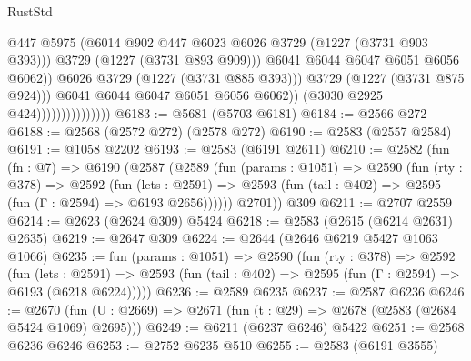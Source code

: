 \begin{lexlean}{RustStd}
\begin{coremodule}
                                              @447
                                              @5975
                                              (@6014
                                                @902
                                                @447
                                                @6023
                                                @6026
                                                @3729
                                                (@1227 (@3731 @903 @393)))
                                              @3729
                                              (@1227 (@3731 @893 @909)))
                                            @6041
                                            @6044
                                            @6047
                                            @6051
                                            @6056
                                            @6062))
                                        @6026
                                        @3729
                                        (@1227 (@3731 @885 @393)))
                                      @3729
                                      (@1227 (@3731 @875 @924)))
                                    @6041
                                    @6044
                                    @6047
                                    @6051
                                    @6056
                                    @6062))
                                (@3030 @2925 @424)))))))))))))))
@6183 := @5681 (@5703 @6181)
@6184 := @2566 @272
@6188 := @2568 (@2572 @272) (@2578 @272)
@6190 := @2583 (@2557 @2584)
@6191 := @1058 @2202
@6193 := @2583 (@6191 @2611)
@6210 := @2582
    (fun (fn : @7) =>
    @6190
      (@2587
        (@2589
          (fun (params : @1051) =>
          @2590
            (fun (rty : @378) =>
            @2592
              (fun (lets : @2591) =>
              @2593 (fun (tail : @402) => @2595 (fun (Γ : @2594) => @6193 @2656))))))
        @2701))
    @309
@6211 := @2707 @2559
@6214 := @2623 (@2624 @309) @5424
@6218 := @2583 (@2615 (@6214 @2631) @2635)
@6219 := @2647 @309
@6224 := @2644 (@2646 @6219 @5427 @1063 @1066)
@6235 := fun (params : @1051) =>
  @2590
    (fun (rty : @378) =>
    @2592
      (fun (lets : @2591) =>
      @2593 (fun (tail : @402) => @2595 (fun (Γ : @2594) => @6193 (@6218 @6224)))))
@6236 := @2589 @6235
@6237 := @2587 @6236
@6246 := @2670 (fun (U : @2669) => @2671 (fun (t : @29) => @2678 (@2583 (@2684 @5424 @1069) @2695)))
@6249 := @6211 (@6237 @6246) @5422
@6251 := @2568 @6236 @6246
@6253 := @2752 @6235 @510
@6255 := @2583 (@6191 @3555)

\end{coremodule}
\end{lexlean}
